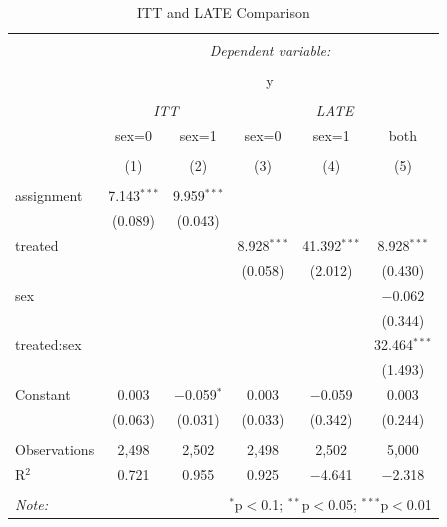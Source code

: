 \documentclass[a4paper]{article}
\begin{document}
\begin{table}[!htbp] \centering 
  \caption{ITT and LATE Comparison} 
  \label{tab:late} 
\begin{tabular}{@{\extracolsep{5pt}}lccccc} 
\\[-1.8ex]\hline 
\hline \\[-1.8ex] 
 & \multicolumn{5}{c}{\textit{Dependent variable:}} \\ 
\cline{2-6} 
\\[-1.8ex] & \multicolumn{5}{c}{y} \\ 
\\[-1.8ex] & \multicolumn{2}{c}{\textit{ITT}} & \multicolumn{3}{c}{\textit{LATE}} \\ 
 & sex=0 & sex=1 & sex=0 & sex=1 & both \\ 
\\[-1.8ex] & (1) & (2) & (3) & (4) & (5)\\ 
\hline \\[-1.8ex] 
 assignment & 7.143$^{***}$ & 9.959$^{***}$ &  &  &  \\ 
  & (0.089) & (0.043) &  &  &  \\ 
  treated &  &  & 8.928$^{***}$ & 41.392$^{***}$ & 8.928$^{***}$ \\ 
  &  &  & (0.058) & (2.012) & (0.430) \\ 
  sex &  &  &  &  & $-$0.062 \\ 
  &  &  &  &  & (0.344) \\ 
  treated:sex &  &  &  &  & 32.464$^{***}$ \\ 
  &  &  &  &  & (1.493) \\ 
  Constant & 0.003 & $-$0.059$^{*}$ & 0.003 & $-$0.059 & 0.003 \\ 
  & (0.063) & (0.031) & (0.033) & (0.342) & (0.244) \\ 
 \hline \\[-1.8ex] 
Observations & 2,498 & 2,502 & 2,498 & 2,502 & 5,000 \\ 
R$^{2}$ & 0.721 & 0.955 & 0.925 & $-$4.641 & $-$2.318 \\ 
\hline 
\hline \\[-1.8ex] 
\textit{Note:}  & \multicolumn{5}{r}{$^{*}$p$<$0.1; $^{**}$p$<$0.05; $^{***}$p$<$0.01} \\ 
\end{tabular} 
\end{table} 

\end{document}
